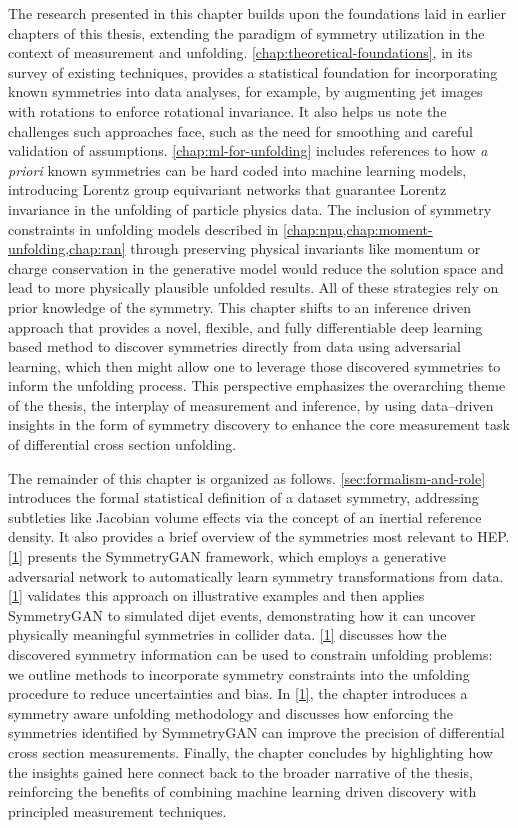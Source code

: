     The research presented in this chapter builds upon the foundations laid in earlier chapters of this thesis, extending the paradigm of symmetry utilization in the context of measurement and unfolding.
    \cref{chap:theoretical-foundations}, in its survey of existing techniques, provides a statistical foundation for incorporating known symmetries into data analyses, for example, by augmenting jet images with rotations to enforce rotational invariance.
    It also helps us note the challenges such approaches face, such as the need for smoothing and careful validation of assumptions.
    \cref{chap:ml-for-unfolding} includes references to how \textit{a priori} known symmetries can be hard coded into machine learning models, introducing Lorentz group equivariant networks that guarantee Lorentz invariance in the unfolding of particle physics data.
    The inclusion of symmetry constraints in unfolding models described in \cref{chap:npu,chap:moment-unfolding,chap:ran} through preserving physical invariants like momentum or charge conservation in the generative model would reduce the solution space and lead to more physically plausible unfolded results.
    All of these strategies rely on prior knowledge of the symmetry.
    This chapter shifts to an inference driven approach that provides a novel, flexible, and fully differentiable deep learning based method to discover symmetries directly from data using adversarial learning, which then might allow one to leverage those discovered symmetries to inform the unfolding process.
    This perspective emphasizes the overarching theme of the thesis, the interplay of measurement and inference, by using data--driven insights in the form of symmetry discovery to enhance the core measurement task of differential cross section unfolding.

    The remainder of this chapter is organized as follows.
    \cref{sec:formalism-and-role} introduces the formal statistical definition of a dataset symmetry, addressing subtleties like Jacobian volume effects via the concept of an inertial reference density.
    It also provides a brief overview of the symmetries most relevant to HEP.
    \cref{1} presents the SymmetryGAN framework, which employs a generative adversarial network to automatically learn symmetry transformations from data.
    \cref{1} validates this approach on illustrative examples and then applies SymmetryGAN to simulated dijet events, demonstrating how it can uncover physically meaningful symmetries in collider data.
    \cref{1} discusses how the discovered symmetry information can be used to constrain unfolding problems: we outline methods to incorporate symmetry constraints into the unfolding procedure to reduce uncertainties and bias.
    In \cref{1}, the chapter introduces a symmetry aware unfolding methodology and discusses how enforcing the symmetries identified by SymmetryGAN can improve the precision of differential cross section measurements.
    Finally, the chapter concludes by highlighting how the insights gained here connect back to the broader narrative of the thesis, reinforcing the benefits of combining machine learning driven discovery with principled measurement techniques.
